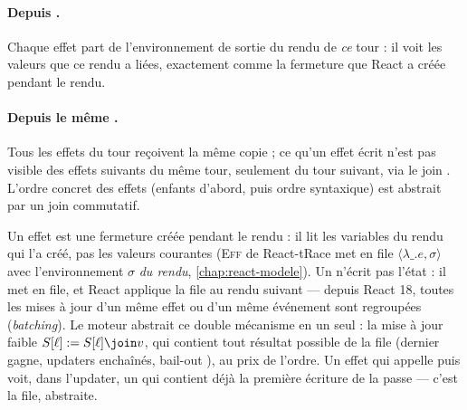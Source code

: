 \paragraph{Depuis .} Chaque effet part de l'environnement de
sortie du rendu de \emph{ce} tour : il voit les valeurs que ce rendu a
liées, exactement comme la fermeture que React a créée pendant le rendu.

\paragraph{Depuis le même .} Tous les effets du tour
reçoivent la même copie  ; ce qu'un effet écrit n'est pas
visible des effets suivants du même tour, seulement du tour suivant, via
le join . L'ordre concret des effets (enfants
d'abord, puis ordre syntaxique) est abstrait par un join commutatif.

\begin{react}
Un effet est une fermeture créée pendant le rendu : il lit les variables du
rendu qui l'a créé, pas les valeurs courantes (\textsc{Eff} de React-tRace
met en file $\langle \lambda\_.e, \sigma\rangle$ avec l'environnement
$\sigma$ \emph{du rendu}, \cref{chap:react-modele}). Un 
n'écrit pas l'état : il met  en file, et React applique la file au
rendu suivant --- depuis React 18, toutes les mises à jour d'un même effet ou
d'un même événement sont regroupées (\emph{batching}). Le moteur abstrait ce
double mécanisme en un seul : la mise à jour faible
$S[\ell] := S[\ell] \join v$, qui contient tout résultat possible de la file
(dernier gagne, updaters enchaînés, bail-out ), au prix de
l'ordre. Un effet qui appelle  puis
 voit, dans l'updater, un  qui
contient déjà la première écriture de la passe --- c'est la file, abstraite.
\end{react}

